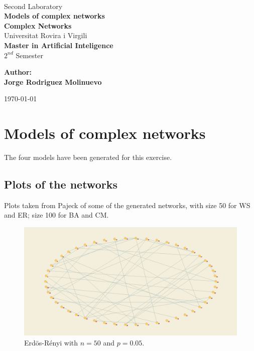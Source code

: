 \documentclass[12pt,a4paper,oneside]{article}
\date{\today}
\numberwithin{equation}{section}
\numberwithin{equation}{section}
\theoremstyle{definition}
\begin{document}
\begin{center}
	\textbf{ }\\[4cm]
	
	\LARGE Second Laboratory\\[0.5cm]
	\textbf{{\Huge Models of complex networks}}\\[0.5cm]
	\textbf{{\LARGE Complex Networks}}\\[1.5cm]
	
	{\Large Universitat Rovira i Virgili}\\[2.3cm]
	{\LARGE \textbf{Master in Artificial Inteligence}}\\[0.5cm]
	{\LARGE $2^{nd}$ Semester}\\[2.5cm]
	
	\begin{flushright}
		\textbf{\large{Author:}\\ \normalsize{Jorge Rodriguez Molinuevo\\}}
	\end{flushright}
	\today
\end{center}
\thispagestyle{empty} 

\pagebreak

\section{Models of complex networks}

The four models have been generated for this exercise.

\subsection{Plots of the networks}

Plots taken from Pajeck of some of the generated networks, with size 50 for WS and ER; size 100 for BA and CM.

\begin{figure}[h!]
	\centering
	\includegraphics[scale=0.25]{plots/ERn=50,p005.jpg}
	\caption{Erdös-Rényi with $n=50$ and $p=0.05$.}
\end{figure}
\end{document}
